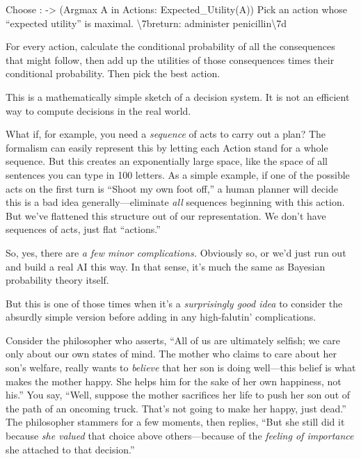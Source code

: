 {
  Choose :\newline
 -{\textgreater} (Argmax A in Actions: Expected\_Utility(A)) Pick an
action whose ``expected utility'' is
maximal. {\textbackslash}{\textquotesingle}7breturn: administer
penicillin{\textbackslash}{\textquotesingle}7d }

{
 For every action, calculate the conditional probability of all the
consequences that might follow, then add up the utilities of those
consequences times their conditional probability. Then pick the best
action.}

{
 This is a mathematically simple sketch of a decision system. It is
not an efficient way to compute decisions in the real world.}

{
 What if, for example, you need a \textit{sequence} of acts to
carry out a plan? The formalism can easily represent this by letting
each Action stand for a whole sequence. But this creates an
exponentially large space, like the space of all sentences you can type
in 100 letters. As a simple example, if one of the possible acts on the
first turn is ``Shoot my own foot
off,'' a human planner will decide this is a bad idea
generally---eliminate \textit{all} sequences beginning with this
action. But we've flattened this structure out of our
representation. We don't have sequences of acts, just
flat ``actions.''}

{
 So, yes, there are \textit{a few minor complications.} Obviously
so, or we'd just run out and build a real AI this way.
In that sense, it's much the same as Bayesian
probability theory itself.}

{
 But this is one of those times when it's a
\textit{surprisingly good idea} to consider the absurdly simple version
before adding in any high-falutin' complications.}

{
 Consider the philosopher who asserts, ``All of us
are ultimately selfish; we care only about our own states of mind. The
mother who claims to care about her son's welfare,
really wants to \textit{believe} that her son is doing well---this
belief is what makes the mother happy. She helps him for the sake of
her own happiness, not his.'' You say,
``Well, suppose the mother sacrifices her life to push
her son out of the path of an oncoming truck. That's
not going to make her happy, just dead.'' The
philosopher stammers for a few moments, then replies,
``But she still did it because \textit{she valued}
that choice above others---because of the \textit{feeling of
importance} she attached to that decision.''}

